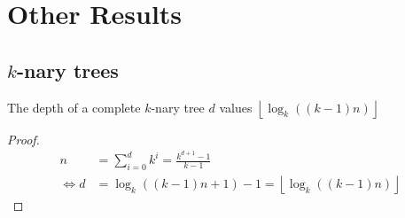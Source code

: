 \section{Other Results}

\subsection{$k$-nary trees}
\begin{lemma}The depth of a complete $k$-nary tree $d$ values $\left\lfloor\log_k((k-1)n)\right\rfloor$
\end{lemma}
\begin{proof}
	\begin{align}
		n &= \sum_{i=0}^{d}k^i = \frac{k^{d+1}-1}{k-1}\\
		\Leftrightarrow d &= \log_k((k-1)n+1)-1 = \left\lfloor\log_k((k-1)n)\right\rfloor
	\end{align}
\end{proof}

